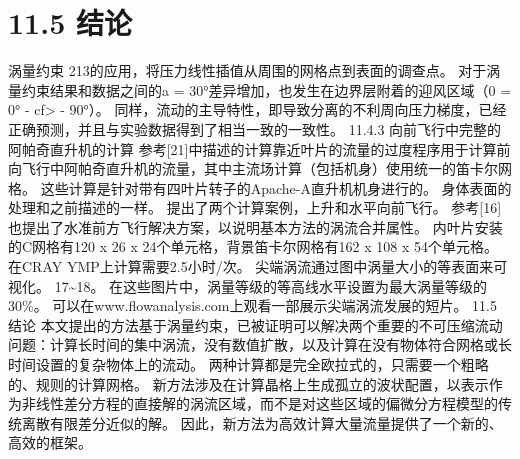 \documentclass[UTF8,11pt,a4paper,openany,fontset=fandol]{ctexbook}
\begin{document}
\section{11.5 结论}
涡量约束 213的应用，将压力线性插值从周围的网格点到表面的调查点。 对于涡量约束结果和数据之间的a = 30°差异增加，也发生在边界层附着的迎风区域（0 = 0° - cf> - 90°）。 同样，流动的主导特性，即导致分离的不利周向压力梯度，已经正确预测，并且与实验数据得到了相当一致的一致性。 11.4.3 向前飞行中完整的阿帕奇直升机的计算 参考[21]中描述的计算靠近叶片的流量的过度程序用于计算前向飞行中阿帕奇直升机的流量，其中主流场计算（包括机身）使用统一的笛卡尔网格。 这些计算是针对带有四叶片转子的Apache-A直升机机身进行的。 身体表面的处理和之前描述的一样。 提出了两个计算案例，上升和水平向前飞行。 参考[16]也提出了水准前方飞行解决方案，以说明基本方法的涡流合并属性。 内叶片安装的C网格有120 x 26 x 24个单元格，背景笛卡尔网格有162 x 108 x 54个单元格。 在CRAY YMP上计算需要2.5小时/次。 尖端涡流通过图中涡量大小的等表面来可视化。 17\textasciitilde{}18。 在这些图片中，涡量等级的等高线水平设置为最大涡量等级的30\%。 可以在www.flowanalysis.com上观看一部展示尖端涡流发展的短片。 11.5 结论 本文提出的方法基于涡量约束，已被证明可以解决两个重要的不可压缩流动问题：计算长时间的集中涡流，没有数值扩散，以及计算在没有物体符合网格或长时间设置的复杂物体上的流动。 两种计算都是完全欧拉式的，只需要一个粗略的、规则的计算网格。 新方法涉及在计算晶格上生成孤立的波状配置，以表示作为非线性差分方程的直接解的涡流区域，而不是对这些区域的偏微分方程模型的传统离散有限差分近似的解。 因此，新方法为高效计算大量流量提供了一个新的、高效的框架。
\end{document}
